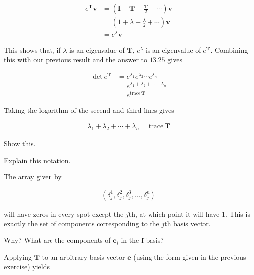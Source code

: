 \documentclass[../the-road-to-reality.tex]{subfiles}
\begin{document}
\begin{questions}
\begin{solution}
        \begin{align*}
                e^\mathbf{T}\mathbf{v} &= (\mathbf{I} + \mathbf{T} + \frac{\mathbf{T}}{2}+\cdots)\mathbf{v} \\
                &= (1 + \lambda + \frac{\lambda}{2}+\cdots)\mathbf{v} \\
                &= e^\lambda\mathbf{v}
        \end{align*}

        This shows that, if $\lambda$ is an eigenvalue of $\mathbf{T}$, $e^\lambda$ is an eigenvalue of $e^\mathbf{T}$. Combining this with our previous result and the answer to $13.25$ gives

        \begin{align*}
                \det{e^\mathbf{T}} &= e^{\lambda_1}e^{\lambda_2}\cdots{e^{\lambda_n}} \\
                &= e^{\lambda_1 + \lambda_2 + \cdots + \lambda_n} \\
                &= e^{\mathrm{trace}\,\mathbf{T}}
        \end{align*}

        Taking the logarithm of the second and third lines gives

        \begin{align*}
                \lambda_1 + \lambda_2 + \cdots + \lambda_n = \mathrm{trace}\,\mathbf{T}
        \end{align*}
\end{solution}

\question Show this.

\question Explain this notation.

\begin{solution}
        The array given by 

        \begin{align*}
                (\delta^1_j, \delta^2_j, \delta^3_j, \dots, \delta^n_j)
        \end{align*}

        will have zeros in every spot except the $j$th, at which point it will have $1$. This is exactly the set of components corresponding to the $j$th basis vector.
\end{solution}

\question Why? What are the components of $\mathbf{e}_i$ in the $\mathbf{f}$ basis?

\begin{solution}
        Applying $\mathbf{T}$ to an arbitrary basis vector $\mathbf{e}$ (using the form given in the previous exercise) yields


\end{solution}
\end{questions}
\end{document}
